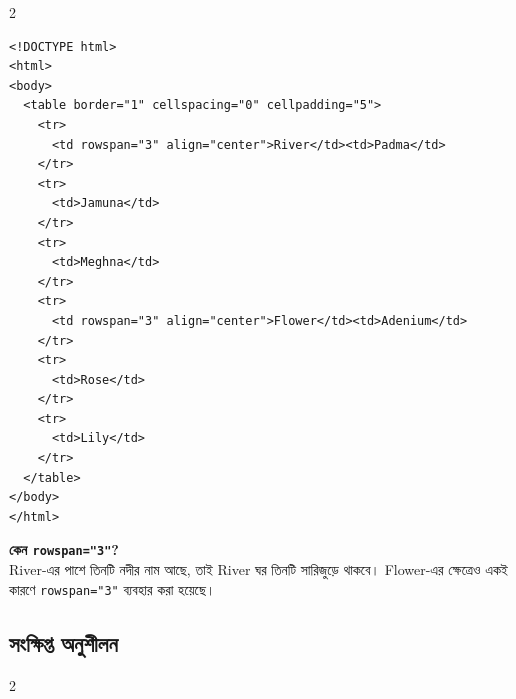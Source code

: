 \par{}\par\smallskip
\begin{multicols}{2}
\begin{verbatim}
<!DOCTYPE html>
<html>
<body>
  <table border="1" cellspacing="0" cellpadding="5">
    <tr>
      <td rowspan="3" align="center">River</td><td>Padma</td>
    </tr>
    <tr>
      <td>Jamuna</td>
    </tr>
    <tr>
      <td>Meghna</td>
    </tr>
    <tr>
      <td rowspan="3" align="center">Flower</td><td>Adenium</td>
    </tr>
    <tr>
      <td>Rose</td>
    </tr>
    <tr>
      <td>Lily</td>
    </tr>
  </table>
</body>
</html>
\end{verbatim}
\end{multicols}


\textbf{কেন \texttt{rowspan="3"}?}\\
River-এর পাশে তিনটি নদীর নাম আছে, তাই River ঘর তিনটি সারিজুড়ে থাকবে। Flower-এর ক্ষেত্রেও একই কারণে \texttt{rowspan="3"} ব্যবহার করা হয়েছে।




\subsection{সংক্ষিপ্ত অনুশীলন}

\begin{multicols}{2}
\noindent\begin{minipage}[t]{\linewidth}\vspace{0pt}
\end{minipage}\par\smallskip
\noindent\begin{minipage}[t]{\linewidth}\vspace{0pt}
\end{minipage}\par\smallskip
\noindent\begin{minipage}[t]{\linewidth}\vspace{0pt}
\end{minipage}\par\smallskip
\noindent\begin{minipage}[t]{\linewidth}\vspace{0pt}
\end{minipage}\par\smallskip
\noindent\begin{minipage}[t]{\linewidth}\vspace{0pt}
\end{minipage}\par\smallskip
\end{multicols}

